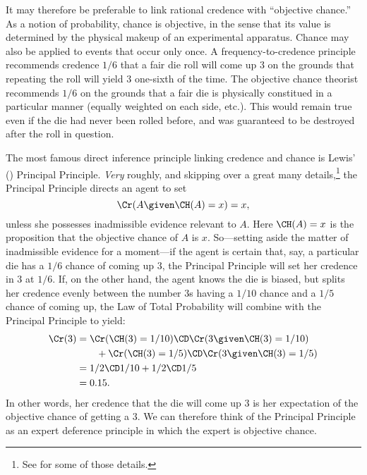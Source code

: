 It may therefore be preferable to link rational credence with ``objective chance.'' As a notion of probability, chance is objective, in the sense that its value is determined by the physical makeup of an experimental apparatus. Chance may also be applied to events that occur only once. A frequency-to-credence principle recommends credence $1/6$ that a fair die roll will come up $3$ on the grounds that repeating the roll will yield $3$ one-sixth of the time. The objective chance theorist recommends $1/6$ on the grounds that a fair die is physically constitued in a particular manner (equally weighted on each side, etc.). This would remain true even if the die had never been rolled before, and was guaranteed to be destroyed after the roll in question.

The most famous direct inference principle linking credence and chance is Lewis' (\citeyear{LewisASGTOC}) Principal Principle. \emph{Very} roughly, and skipping over a great many details,\footnote
{See \citet{MeachamPrincipal} for some of those details.}
the Principal Principle directs an agent to set 
\begin{equation}
\Cr(A \given \CH(A)=x)=x,
\end{equation}
unless she possesses inadmissible evidence relevant to $A$. Here $\CH(A)=x$ is the proposition that the objective chance of $A$ is $x$. So---setting aside the matter of inadmissible evidence for a moment---if the agent is certain that, say, a particular die has a $1/6$ chance of coming up $3$, the Principal Principle will set her credence in $3$ at $1/6$. If, on the other hand, the agent knows the die is biased, but splits her credence evenly between the number $3$s having a $1/10$ chance and a $1/5$ chance of coming up, the Law of Total Probability will combine with the Principal Principle to yield:
\begin{equation}
\begin{aligned}
\Cr(3) &= \Cr(\CH(3)=1/10) \CD \Cr(3 \given \CH(3)=1/10)\\
	   &\qquad +\Cr(\CH(3)=1/5) \CD \Cr(3 \given \CH(3)=1/5)\\
	   &= 1/2 \CD 1/10 + 1/2 \CD 1/5\\
	   &= 0.15.
\end{aligned}
\end{equation}
In other words, her credence that the die will come up $3$ is her expectation of the objective chance of getting a $3$. We can therefore think of the Principal Principle as an expert deference principle in which the expert is objective chance.

